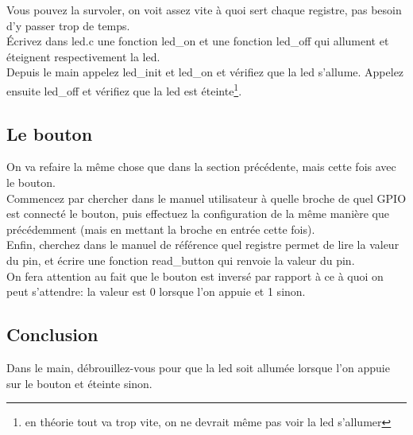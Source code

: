 \documentclass[a4paper,10pt]{article} %
\begin{document}
Vous pouvez la survoler, on voit assez vite à quoi sert chaque registre, pas besoin d'y passer trop de temps.\\

Écrivez dans led.c une fonction led\_on et une fonction led\_off qui allument et éteignent respectivement la led.\\

Depuis le main appelez led\_init et led\_on et vérifiez que la led s'allume. Appelez ensuite led\_off et vérifiez que la led est éteinte\footnote{en théorie tout va trop vite, on ne devrait même pas voir la led s'allumer}.

\subsection{Le bouton}
On va refaire la même chose que dans la section précédente, mais cette fois avec le bouton.\\

Commencez par chercher dans le manuel utilisateur à quelle broche de quel GPIO est connecté le bouton, puis effectuez la configuration de la même manière que précédemment (mais en mettant la broche en entrée cette fois).\\

Enfin, cherchez dans le manuel de référence quel registre permet de lire la valeur du pin, et écrire une fonction read\_button qui renvoie la valeur du pin.\\

On fera attention au fait que le bouton est inversé par rapport à ce à quoi on peut s'attendre: la valeur est 0 lorsque l'on appuie et 1 sinon.

\subsection{Conclusion}
Dans le main, débrouillez-vous pour que la led soit allumée lorsque l'on appuie sur le bouton et éteinte sinon.
\end{document}
